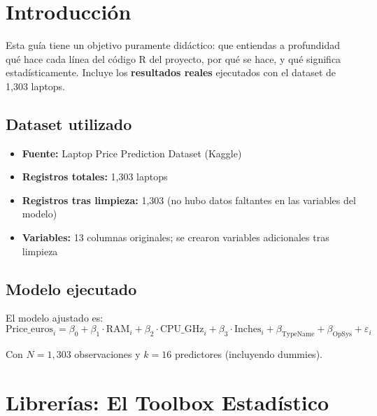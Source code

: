 \documentclass[12pt,a4paper]{article}
\begin{document}
\section{Introducción}

Esta guía tiene un objetivo puramente didáctico: que entiendas a profundidad qué hace cada línea del código R del proyecto, por qué se hace, y qué significa estadísticamente. Incluye los \textbf{resultados reales} ejecutados con el dataset de 1,303 laptops.

\subsection{Dataset utilizado}

\begin{itemize}
    \item \textbf{Fuente:} Laptop Price Prediction Dataset (Kaggle)
    \item \textbf{Registros totales:} 1,303 laptops
    \item \textbf{Registros tras limpieza:} 1,303 (no hubo datos faltantes en las variables del modelo)
    \item \textbf{Variables:} 13 columnas originales; se crearon variables adicionales tras limpieza
\end{itemize}

\subsection{Modelo ejecutado}

El modelo ajustado es:
\[
\text{Price\_euros}_i = \beta_0 + \beta_1 \cdot \text{RAM}_i + \beta_2 \cdot \text{CPU\_GHz}_i + \beta_3 \cdot \text{Inches}_i + \beta_{\text{TypeName}} + \beta_{\text{OpSys}} + \varepsilon_i
\]

Con $N = 1{,}303$ observaciones y $k = 16$ predictores (incluyendo dummies).

\section{Librerías: El Toolbox Estadístico}
\end{document}
